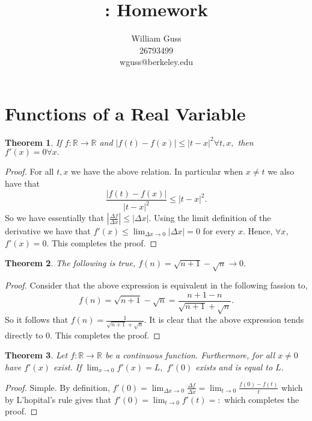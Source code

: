 \documentclass[letter]{article}
\title{\bCLASS: Homework \bHWN}
\author{William Guss\\26793499\\wguss@berkeley.edu}
\newtheorem{theorem}{Theorem}
\newenvironment{menumerate}{%
  \edef\backupindent{\the\parindent}%
  \enumerate%
  \setlength{\parindent}{\backupindent}%
}{\endenumerate}
\begin{document}
\maketitle
\thispagestyle{empty}


\setcounter{section}{2}
\section{Functions of a Real Variable}

\begin{menumerate}
	\item 
	\begin{theorem}
		If $f: \mathbb{R} \to \mathbb{R}$ and $|f(t) - f(x)| \leq |t -x|^2 \forall t,x,$ then $f'(x) = 0 \forall x.$
	\end{theorem}

	\begin{proof}
		For all $t,x$ we have the above relation. In particular when $x \neq t$ we also have that $$\frac{|f(t) - f(x)|}{|t -x|^2} \leq |t -x|^2.$$ So we have essentially that $\left|\frac{\Delta f}{\Delta x}\right| \leq |\Delta x|$. Using the limit definition of the derivative we have that $f'(x) \leq \lim_{\Delta x \to 0} |\Delta x| = 0$ for every $x$. Hence, $\forall x$, $f'(x) = 0.$ This completes the proof.
	\end{proof}


	\setcounter{enumi}{3}
	\item 
	\begin{theorem}
		The following is true, $f(n) = \sqrt{n+1} - \sqrt{n} \to 0.$
	\end{theorem}
	\begin{proof}
	Consider that the above expression is equivalent in the following fassion to,
	$$f(n) = \sqrt{n+1} - \sqrt{n}  = \frac{n+1 -n}{\sqrt{n+1} + \sqrt{n}}.$$
	So it follows that $f(n) = \frac{1}{\sqrt{n+1} + \sqrt{n}}.$ It is clear that the above expression tends directly to $0.$ This completes the proof.
	\end{proof}

	\item 
	\begin{theorem}
	Let $f: \mathbb{R} \to \mathbb{R}$ be a continuous function. Furthermore, for all $x \neq 0$ have $f'(x)$ exist. If $\lim_{x\to 0} f'(x) = L,$ $f'(0)$ exists and is equal to $L.$
	\end{theorem}
	\begin{proof}
	Simple. By definition, $f'(0) = \lim_{\Delta x \to 0} \frac{\Delta f}{\Delta x} = \lim_{t\to 0} \frac{f(0)-f(t)}{t}$ which by L'hopital's rule gives that $f'(0) = \lim_{t\to 0}{f'(t)} = :$ which completes the proof.
	\end{proof}



\end{menumerate}
\end{document}
